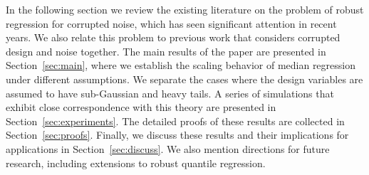In the following section we review the existing literature on the problem of robust regression for corrupted noise, which has seen significant attention in recent years. We also relate this problem to previous work that considers corrupted design and noise together. The main results of the paper are presented in Section~\ref{sec:main}, where we establish the scaling behavior of median regression under different assumptions. We separate the cases where the design variables are assumed to have sub-Gaussian and heavy tails. A series of simulations that exhibit close correspondence with this theory are presented in Section~\ref{sec:experiments}. The detailed proofs of these results are collected in Section~\ref{sec:proofs}.  Finally, we discuss these results and their implications for applications in Section~\ref{sec:discuss}. We also mention directions for future research, including extensions to robust quantile regression.

